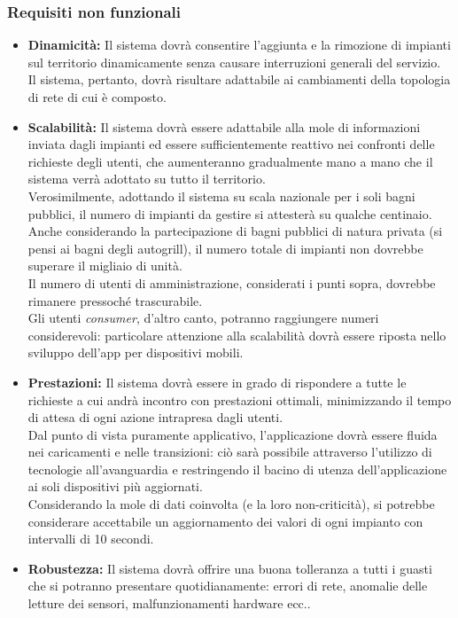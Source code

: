 \documentclass[12pt]{article}
\begin{document}
\subsubsection{Requisiti non funzionali}
\begin{itemize}
\item \textbf{Dinamicità:} Il sistema dovrà consentire l’aggiunta e la rimozione di impianti sul territorio dinamicamente senza causare interruzioni generali del servizio.\\ Il sistema, pertanto, dovrà risultare adattabile ai cambiamenti della topologia di rete di cui è composto.
\item \textbf{Scalabilità:} Il sistema dovrà essere adattabile alla mole di informazioni inviata dagli impianti ed essere sufficientemente reattivo nei confronti delle richieste degli utenti, che aumenteranno gradualmente mano a mano che il sistema verrà adottato su tutto il territorio.\\
Verosimilmente, adottando il sistema su scala nazionale per i soli bagni pubblici, il numero di impianti da gestire si attesterà su qualche centinaio.\\
Anche considerando la partecipazione di bagni pubblici di natura privata (si pensi ai bagni degli autogrill), il numero totale di impianti non dovrebbe superare il migliaio di unità.\\ 
Il numero di utenti di amministrazione, considerati i punti sopra, dovrebbe rimanere pressoché trascurabile.\\
Gli utenti \textit{consumer}, d'altro canto, potranno raggiungere numeri considerevoli: particolare attenzione alla scalabilità dovrà essere riposta nello sviluppo dell'app per dispositivi mobili.
\item \textbf{Prestazioni:} Il sistema dovrà essere in grado di rispondere a tutte le richieste a cui andrà incontro con prestazioni ottimali, minimizzando il tempo di attesa di ogni azione intrapresa dagli utenti.\\
Dal punto di vista puramente applicativo, l'applicazione dovrà essere fluida nei caricamenti e nelle transizioni: ciò sarà possibile attraverso l'utilizzo di tecnologie all'avanguardia e restringendo il bacino di utenza dell'applicazione ai soli dispositivi più aggiornati.\\
Considerando la mole di dati coinvolta (e la loro non-criticità), si potrebbe considerare accettabile un aggiornamento dei valori di ogni impianto con intervalli di 10 secondi.
\item \textbf{Robustezza:} Il sistema dovrà offrire una buona tolleranza a tutti i guasti che si potranno presentare quotidianamente: errori di rete, anomalie delle letture dei sensori,  malfunzionamenti hardware ecc..\\ 

\end{itemize}
\end{document}
